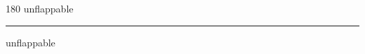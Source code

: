 
\begin{frame}
\begin{center}
\begin{turn}{180}
{\fontsize{2.5cm}{1em}\selectfont unflappable}
\end{turn}
\vspace{1em}\par  
\hrule
\vspace{1em}\par  
{\fontsize{2.5cm}{1em}\selectfont unflappable}
\end{center}
\end{frame}
